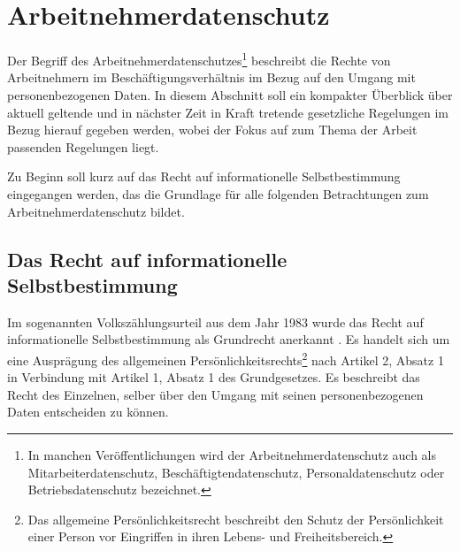 \section{Arbeitnehmerdatenschutz}

\label{sec_basics_employee_privacy}


Der Begriff des Arbeitnehmerdatenschutzes\footnote{
  In manchen Veröffentlichungen wird der Arbeitnehmerdatenschutz auch als Mitarbeiterdatenschutz, Beschäftigtendatenschutz, Personaldatenschutz oder Betriebsdatenschutz bezeichnet.
}
beschreibt die Rechte von Arbeitnehmern im Beschäftigungsverhältnis im Bezug auf den Umgang mit personenbezogenen Daten. In diesem Abschnitt soll ein kompakter Überblick über aktuell geltende und in nächster Zeit in Kraft tretende gesetzliche Regelungen im Bezug hierauf gegeben werden, wobei der Fokus auf zum Thema der Arbeit passenden Regelungen liegt.

Zu Beginn soll kurz auf das Recht auf informationelle Selbstbestimmung eingegangen werden, das die Grundlage für alle folgenden Betrachtungen zum Arbeitnehmerdatenschutz bildet.

\subsection*{Das Recht auf informationelle Selbstbestimmung}

Im sogenannten Volkszählungsurteil aus dem Jahr 1983 wurde das Recht auf informationelle Selbstbestimmung als Grundrecht anerkannt \cite{TODO}. 
Es handelt sich um eine Ausprägung des allgemeinen Persönlichkeitsrechts\footnote{
  Das allgemeine Persönlichkeitsrecht beschreibt den Schutz der Persönlichkeit einer Person vor Eingriffen in ihren Lebens- und Freiheitsbereich.
} nach Artikel 2, Absatz 1 in Verbindung mit Artikel 1, Absatz 1 des Grundgesetzes. Es beschreibt das Recht des Einzelnen, selber über den Umgang mit seinen personenbezogenen Daten entscheiden zu können. 

%    
%    
%        
    
